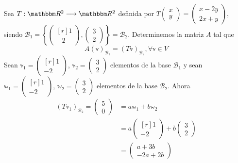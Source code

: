 \begin{example}
    Sea $T:\RR[2] \longrightarrow \RR[2]$ definida por $T\begin{pmatrix} x \\ y \end{pmatrix} = \begin{pmatrix} x-2y \\ 2x+y \end{pmatrix}$, siendo $\mathcal{B}_1 = \left\{ \begin{pmatrix*}[r] 1 \\ -2 \end{pmatrix*}, \begin{pmatrix} 3 \\ 2 \end{pmatrix} \right\} = \mathcal{B}_2$. Determinemos la matriz $A$ tal que
    $$A(\mathbb{v})_{\mathcal{B}_1} = (T\mathbb{v})_{\mathcal{B}_2}, \forall \mathbb{v} \in V$$
    Sean $\mathbb{v}_1 = \begin{pmatrix*}[r] 1 \\ -2 \end{pmatrix*}$, $\mathbb{v}_2 = \begin{pmatrix} 3 \\ 2 \end{pmatrix}$ elementos de la base $\mathcal{B}_1$ y sean $\mathbb{w}_1 = \begin{pmatrix*}[r] 1 \\ -2 \end{pmatrix*}$, $\mathbb{w}_2 = \begin{pmatrix} 3 \\ 2 \end{pmatrix}$ elementos de la base $\mathcal{B}_2$. Ahora
    \begin{align*}
        (T\mathbb{v}_1)_{\mathcal{B}_2} = \begin{pmatrix} 5 \\ 0 \end{pmatrix} & = a\mathbb{w}_1 + b\mathbb{w}_2 \\
        & = a \begin{pmatrix*}[r] 1 \\ -2 \end{pmatrix*} + b\begin{pmatrix} 3 \\ 2 \end{pmatrix} \\
        & = \begin{pmatrix} a+3b \\ -2a+2b \end{pmatrix}

\end{align*}
\end{example}
